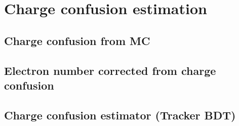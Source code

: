\section{Charge confusion estimation}

\subsection{Charge confusion from MC}
\subsection{Electron number corrected from charge confusion}
\subsection{Charge confusion estimator (Tracker BDT)}